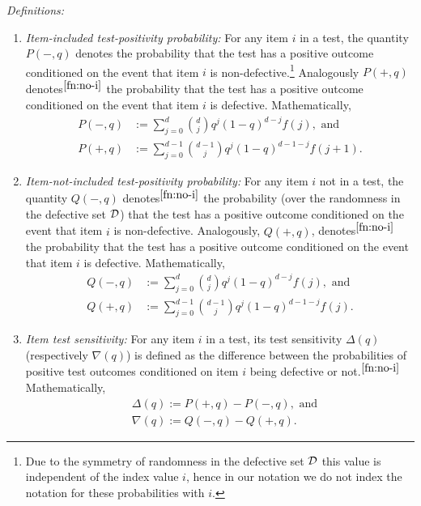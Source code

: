 \documentclass[onecolumn,letterpaper]{IEEEtran}
\newtheorem{definition}{Definition}
\newcommand{\cD}{{\cal D}}
\newcommand{\cp}{{q}}
\newcommand{\pn}{{P(-,\cp)}}
\newcommand{\pp}{{P(+,\cp)}}
\newcommand{\pgap}{{\Delta(\cp)}}
\newcommand{\pnm}{{Q(-,\cp)}}
\newcommand{\ppm}{{Q(+,\cp)}}
\newcommand{\pgapm}{{\nabla(\cp)}}
\begin{document}
\textit{Definitions:}
\begin{enumerate}
\item {\it Item-included test-positivity probability:} For any item $i$ in a test, the quantity $\pn$ denotes the probability that  the test has a positive outcome conditioned on the event that item $i$ is non-defective.\footnote{\label{fn:no-i} Due to the symmetry of randomness in the defective set ${\cD}$ this value is independent of the index value $i$, hence in our notation we do not index the notation for these probabilities with $i$.} Analogously $\pp$ denotes$^{\ref{fn:no-i}}$ the probability that the test has a positive outcome conditioned on the event that item $i$ is defective. Mathematically,
\begin{equation}
\label{eq:def:p-p+}
\begin{aligned}
\pn &:= \sum\limits_{j=0}^{d} \binom{d}{j} \cp^j (1-\cp)^{d-j} f(j),\text{ and} \\
\pp &:= \sum\limits_{j=0}^{d-1} \binom{d-1}{j} \cp^j (1-\cp)^{d-1-j} f(j+1).
\end{aligned}
\end{equation}
%
\item {\it Item-not-included test-positivity probability:} For any item $i$ not in a test, the quantity $\pnm$ denotes$^{\ref{fn:no-i}}$ the probability (over the randomness in the defective set ${\cD}$) that the test has a positive outcome conditioned on the event that item $i$ is non-defective. Analogously, $\ppm$, denotes$^{\ref{fn:no-i}}$ the probability that the test has a positive outcome conditioned on the event that item $i$ is defective. Mathematically,
\begin{equation}
\label{eq:def:p-pp+p}
\begin{aligned}
\pnm &:= \sum\limits_{j=0}^{d} \binom{d}{j} \cp^j (1-\cp)^{d-j} f(j),\text{ and} \\
\ppm &:= \sum\limits_{j=0}^{d-1} \binom{d-1}{j} \cp^j (1-\cp)^{d-1-j} f(j).
\end{aligned}
\end{equation}
%
\item \label{item:def:Delta}{\it Item test sensitivity:} For any item $i$ in a test, its test sensitivity $\pgap$ (respectively $\pgapm$) is defined as the difference between the probabilities of positive test outcomes conditioned on item $i$ being defective or not.$^{\ref{fn:no-i}}$ Mathematically,
\begin{equation}\label{eq:def:delta}
\begin{aligned}
    &\pgap := \pp - \pn, \text{ and} \\
    &\pgapm := \pnm - \ppm .
\end{aligned}
\end{equation}


\end{enumerate}
\end{document}
